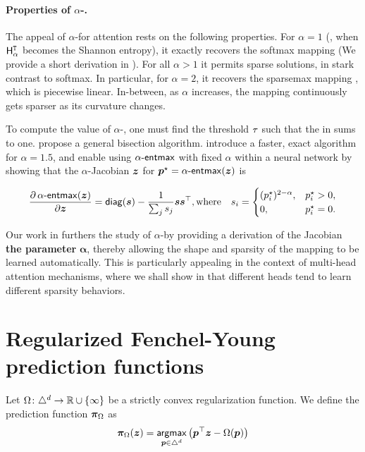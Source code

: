 \paragraph*{Properties of {\boldmath $\alpha$}-\entmaxtext.}
The appeal of $\alpha$-\entmaxtext for attention rests on the
following properties. For $\alpha=1$ (\ie, when $\HHt_\alpha$ becomes
the Shannon entropy), it exactly recovers the softmax mapping (We
provide a short derivation in ). For all $\alpha>1$
it permits sparse solutions, in stark contrast to softmax. In
particular, for $\alpha=2$, it recovers the sparsemax mapping
\citep{sparsemax}, which is piecewise linear. In-between, as $\alpha$
increases, the mapping continuously gets sparser as its curvature
changes.

To compute the value of $\alpha$-\entmaxtext, one must find the
threshold $\tau$ such that the \rhs in  sums
to one. \citet{blondel2019learning} propose a general bisection
algorithm. \citet{entmax} introduce a faster, exact algorithm for
$\alpha=1.5$, and enable using $\mathop{\mathsf{\alpha}\textnormal{-}\mathsf{entmax}}$ with fixed $\alpha$ within
a neural network by showing that the $\alpha$-\entmaxtext Jacobian
\wrt $\bm{z}$ for $\bm{p}^\star = \mathop{\mathsf{\alpha}\textnormal{-}\mathsf{entmax}}(\bm{z})$ is

\begin{equation}
    \begin{aligned}
        \frac{\partial \mathop{\mathsf{\alpha}\textnormal{-}\mathsf{entmax}}(\bm{z})}{\partial \bm{z}} = \operatorname*{\mathsf{diag}}(\bm{s}) - \frac{1}{\sum_j s_j} \bm{ss}^\top,
        \text{where}\quad s_i = \begin{cases}(p_i^\star)^{2-\alpha}, & p_i^\star > 0, \\
             0,                        & p_i^\star = 0. \\\end{cases}
    \end{aligned}
\end{equation}

Our work in  furthers the study of
$\alpha$-\entmaxtext by providing a derivation of the Jacobian {\bf
        \wrt the parameter} $\boldsymbol{\alpha}$, thereby allowing the shape
and sparsity of the mapping to be learned automatically. This is
particularly appealing in the context of multi-head attention
mechanisms, where we shall show in  that different
heads tend to learn different sparsity behaviors.

\section*{Regularized Fenchel-Young prediction functions}
\begin{definition}\label{def:rpf}

    Let $\Omega \colon \triangle^d \to \mathbb{R} \cup \{\infty\}$ be a strictly convex
    regularization function. We define the prediction function $\bm{\pi}_{\Omega}$ as
    \begin{equation}
        \bm{\pi}_{\Omega}(\bm{z}) = \operatorname*{\mathsf{argmax}}_{\bm{p} \in \triangle^d}
        \big(\bm{p}^\top\bm{z} - \Omega(\bm{p})\big)
        \label{eq:amap}
    \end{equation}
\end{definition}

